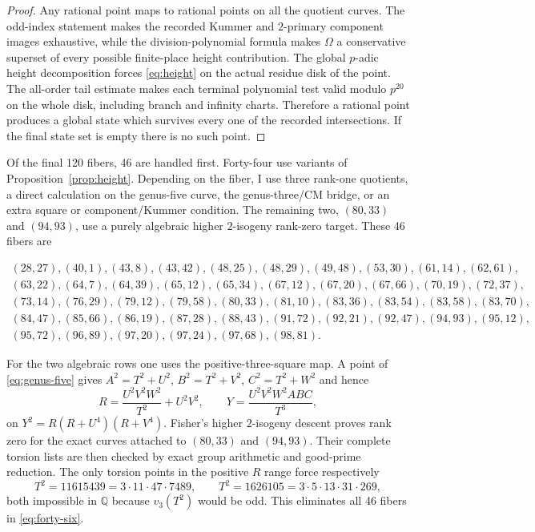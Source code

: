 \documentclass[11pt,a4paper]{amsart}
\newcommand{\Q}{\mathbb Q}
\begin{document}
\begin{proof}
Any rational point maps to rational points on all the quotient curves. The odd-index statement makes the recorded Kummer and $2$-primary component images exhaustive, while the division-polynomial formula makes $\Omega$ a conservative superset of every possible finite-place height contribution. The global $p$-adic height decomposition forces \eqref{eq:height} on the actual residue disk of the point. The all-order tail estimate makes each terminal polynomial test valid modulo $p^{20}$ on the whole disk, including branch and infinity charts. Therefore a rational point produces a global state which survives every one of the recorded intersections. If the final state set is empty there is no such point.
\end{proof}

Of the final 120 fibers, 46 are handled first. Forty-four use variants of Proposition~\ref{prop:height}. Depending on the fiber, I use three rank-one quotients, a direct calculation on the genus-five curve, the genus-three/CM bridge, or an extra square or component/Kummer condition. The remaining two, $(80,33)$ and $(94,93)$, use a purely algebraic higher $2$-isogeny rank-zero target. These 46 fibers are
\begin{small}
\begin{equation}\label{eq:forty-six}
\begin{gathered}
(28,27),(40,1),(43,8),(43,42),(48,25),(48,29),(49,48),(53,30),(61,14),(62,61),\\
(63,22),(64,7),(64,39),(65,12),(65,34),(67,12),(67,20),(67,66),(70,19),(72,37),\\
(73,14),(76,29),(79,12),(79,58),(80,33),(81,10),(83,36),(83,54),(83,58),(83,70),\\
(84,47),(85,66),(86,19),(87,28),(88,43),(91,72),(92,21),(92,47),(94,93),(95,12),\\
(95,72),(96,89),(97,20),(97,24),(97,68),(98,81).
\end{gathered}
\end{equation}
\end{small}
For the two algebraic rows one uses the positive-three-square map. A point of \eqref{eq:genus-five} gives $A^2=T^2+U^2$, $B^2=T^2+V^2$, $C^2=T^2+W^2$ and hence
\[
R=\frac{U^2V^2W^2}{T^2}+U^2V^2,\qquad
Y=\frac{U^2V^2W^2ABC}{T^3},
\]
on $Y^2=R(R+U^4)(R+V^4)$. Fisher's higher $2$-isogeny descent \cite{Fisher} proves rank zero for the exact curves attached to $(80,33)$ and $(94,93)$. Their complete torsion lists are then checked by exact group arithmetic and good-prime reduction. The only torsion points in the positive $R$ range force respectively
\[
T^2=11615439=3\cdot11\cdot47\cdot7489,\qquad
T^2=1626105=3\cdot5\cdot13\cdot31\cdot269,
\]
both impossible in $\Q$ because $v_3(T^2)$ would be odd. This eliminates all 46 fibers in \eqref{eq:forty-six}.
\end{document}
